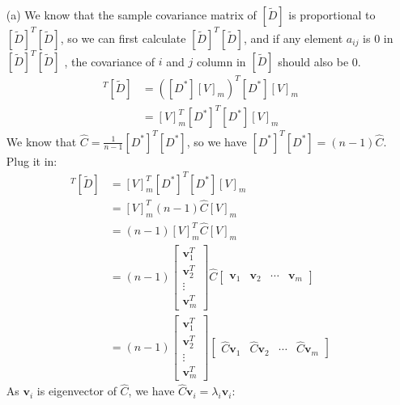 \documentclass[11pt]{article}
\renewcommand{\vec}[1]{\mathbf{#1}}
\begin{document}
\begin{answertext}{14cm}{}
\begin{enumerate}
\item[(a)] We know that the sample covariance matrix of $[\tilde{D}]$ is proportional to $[\tilde{D}]^T [\tilde{D}]$, so we can first calculate $[\tilde{D}]^T [\tilde{D}]$, and if any element $a_{ij}$ is 0 in $[\tilde{D}]^T [\tilde{D}]$ , the covariance of $i$ and $j$ column in $[\tilde{D}]$ should also be 0.
\begin{align*}
[\tilde{D}]^T [\tilde{D}] &= ([D^*] [V]_m)^T[D^*] [V]_m\\
&= [V]_m^T [D^*]^T [D^*] [V]_m
\end{align*}
We know that $\hat{C} = \frac{1}{n-1}[D^*]^T [D^*]$, so we have $[D^*]^T [D^*]=(n-1)\hat{C}$. Plug it in:
\begin{align*}
[\tilde{D}]^T [\tilde{D}] &= [V]_m^T [D^*]^T [D^*] [V]_m\\
&= [V]_m^T (n-1)\hat{C} [V]_m\\
&= (n-1) [V]_m^T \hat{C} [V]_m\\
&= (n-1)
\begin{bmatrix}
\vec{v}_1^T\\
\vec{v}_2^T\\
\vdots\\
\vec{v}_m^T
\end{bmatrix}
\hat{C}
\begin{bmatrix}
\vec{v}_1 & \vec{v}_2 & \cdots & \vec{v}_m
\end{bmatrix}\\
&= (n-1)
\begin{bmatrix}
\vec{v}_1^T\\
\vec{v}_2^T\\
\vdots\\
\vec{v}_m^T
\end{bmatrix}
\begin{bmatrix}
\hat{C}\vec{v}_1 & \hat{C}\vec{v}_2 & \cdots & \hat{C}\vec{v}_m
\end{bmatrix}
\end{align*}
As $\vec{v}_i$ is eigenvector of $\hat{C}$, we have $\hat{C}\vec{v}_i = \lambda_i \vec{v}_i$:
\end{enumerate}
\end{answertext}
\end{document}
